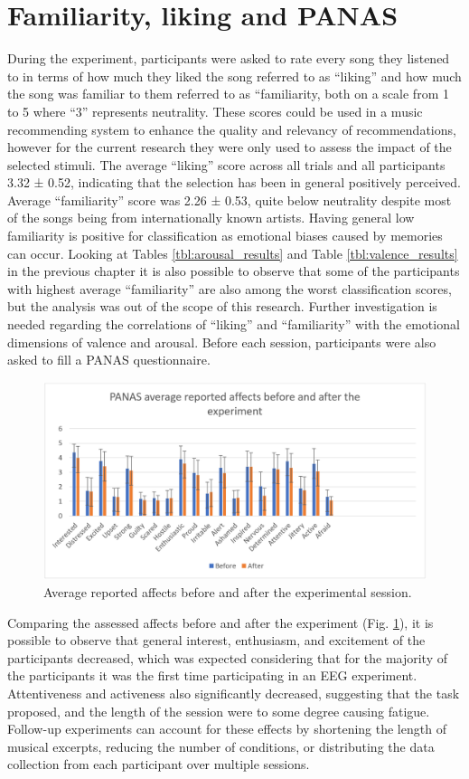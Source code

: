 \section{Familiarity, liking and PANAS}
\label{sec:familiarity_liking_panas}
During the experiment, participants were asked to rate every song they listened to in terms of how much they liked the song referred to as “liking” and how much the song was familiar to them referred to as “familiarity, both on a scale from 1 to 5 where “3” represents neutrality. These scores could be used in a music recommending system to enhance the quality and relevancy of recommendations, however for the current research they were only used to assess the impact of the selected stimuli. The average “liking” score across all trials and all participants 3.32 ± 0.52, indicating that the selection has been in general positively perceived. Average “familiarity” score was 2.26 ± 0.53, quite below neutrality despite most of the songs being from internationally known artists. Having general low familiarity is positive for classification as emotional biases caused by memories can occur. Looking at Tables \ref{tbl:arousal_results} and Table \ref{tbl:valence_results}  in the previous chapter it is also possible to observe that some of the participants with highest average “familiarity” are also among the worst classification scores, but the analysis was out of the scope of this research. Further investigation is needed regarding the correlations of “liking” and “familiarity” with the emotional dimensions of valence and arousal. Before each session, participants were also asked to fill a PANAS questionnaire. 

\begin{figure}[h!]
\includegraphics[width=12cm]{img/discussion/panas.png}
\centering
\caption{Average reported affects before and after the experimental session.} \label{fig:panas}
\end{figure}
Comparing the assessed affects before and after the experiment (Fig. \ref{fig:panas}), it is possible to observe that general interest, enthusiasm, and excitement of the participants decreased, which was expected considering that for the majority of the participants it was the first time participating in an EEG experiment. Attentiveness and activeness also significantly decreased, suggesting that the task proposed, and the length of the session were to some degree causing fatigue. Follow-up experiments can account for these effects by shortening the length of musical excerpts, reducing the number of conditions, or distributing the data collection from each participant over multiple sessions.

